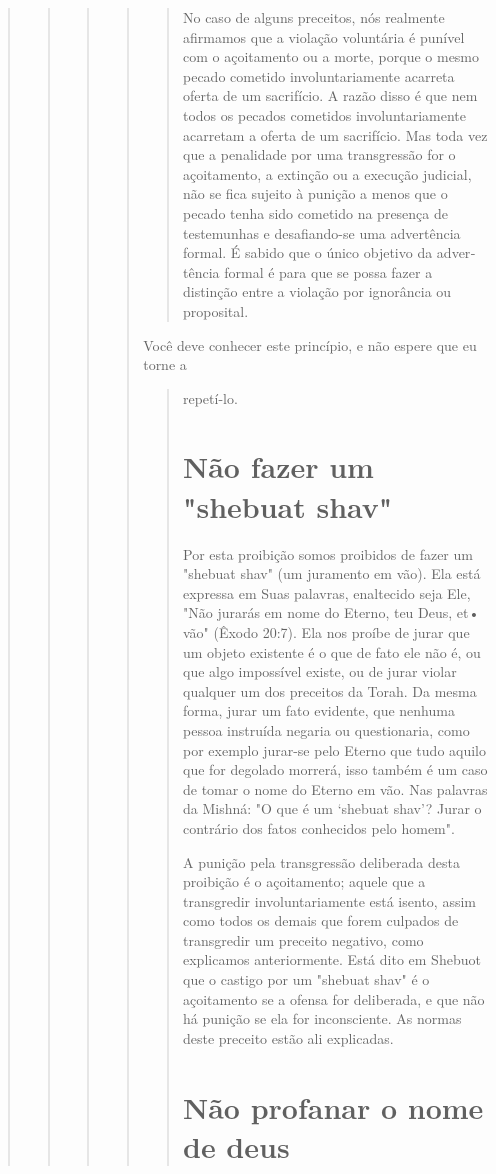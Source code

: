 \begin{quote}
\begin{quote}
\begin{quote}
\begin{quote}
\begin{quote}
No caso de alguns preceitos, nós realmente afirmamos que a viola­ção
voluntária é punível com o açoitamento ou a morte, porque o mesmo
pe­cado cometido involuntariamente acarreta oferta de um sacrifício. A
razão dis­so é que nem todos os pecados cometidos involuntariamente
acarretam a ofer­ta de um sacrifício. Mas toda vez que a penalidade por
uma transgressão for o açoitamento, a extinção ou a execução judicial,
não se fica sujeito à punição a menos que o pecado tenha sido cometido
na presença de testemunhas e desafiando-se uma advertência formal. É
sabido que o único objetivo da adver­tência formal é para que se possa
fazer a distinção entre a violação por ignorân­cia ou proposital.
\end{quote}

Você deve conhecer este princípio, e não espere que eu torne a

\begin{quote}
repetí-lo.

\section{Não fazer um "shebuat shav"}

Por esta proibição somos proibidos de fazer um "shebuat shav" (um
juramento em vão). Ela está expressa em Suas palavras, enaltecido seja
Ele, "Não jurarás em nome do Eterno, teu Deus, et• vão" (Êxodo 20:7).
Ela nos proíbe de jurar que um objeto existente é o que de fato ele não
é, ou que algo impossí­vel existe, ou de jurar violar qualquer um dos
preceitos da Torah. Da mesma forma, jurar um fato evidente, que nenhuma
pessoa instruída negaria ou ques­tionaria, como por exemplo jurar-se
pelo Eterno que tudo aquilo que for dego­lado morrerá, isso também é um
caso de tomar o nome do Eterno em vão. Nas palavras da Mishná: "O que é
um `shebuat shav'? Jurar o contrário dos fatos conhecidos pelo homem".

A punição pela transgressão deliberada desta proibição é o açoita­mento;
aquele que a transgredir involuntariamente está isento, assim como
to­dos os demais que forem culpados de transgredir um preceito negativo,
como explicamos anteriormente. Está dito em Shebuot que o castigo por um
"she­buat shav" é o açoitamento se a ofensa for deliberada, e que não há
punição se ela for inconsciente. As normas deste preceito estão ali
explicadas.

\section{Não profanar o nome de deus}


\end{quote}
\end{quote}
\end{quote}
\end{quote}
\end{quote}
